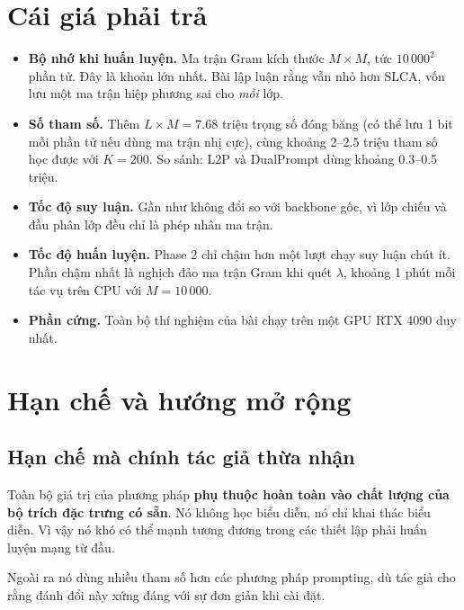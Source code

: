 \documentclass[11pt,a4paper]{article}
\begin{document}
\section{Cái giá phải trả}

\begin{itemize}[leftmargin=*]
\item \textbf{Bộ nhớ khi huấn luyện.} Ma trận Gram kích thước $M \times M$, tức
      $10\,000^2$ phần tử. Đây là khoản lớn nhất. Bài lập luận rằng vẫn nhỏ hơn
      SLCA, vốn lưu một ma trận hiệp phương sai cho \emph{mỗi} lớp.
\item \textbf{Số tham số.} Thêm $L \times M = 7.68$ triệu trọng số đóng băng (có
      thể lưu 1 bit mỗi phần tử nếu dùng ma trận nhị cực), cùng khoảng 2--2.5
      triệu tham số học được với $K = 200$. So sánh: L2P và DualPrompt dùng
      khoảng 0.3--0.5 triệu.
\item \textbf{Tốc độ suy luận.} Gần như không đổi so với backbone gốc, vì lớp
      chiếu và đầu phân lớp đều chỉ là phép nhân ma trận.
\item \textbf{Tốc độ huấn luyện.} Phase 2 chỉ chậm hơn một lượt chạy suy luận
      chút ít. Phần chậm nhất là nghịch đảo ma trận Gram khi quét $\lambda$,
      khoảng 1 phút mỗi tác vụ trên CPU với $M = 10\,000$.
\item \textbf{Phần cứng.} Toàn bộ thí nghiệm của bài chạy trên một GPU
      RTX 4090 duy nhất.
\end{itemize}

\section{Hạn chế và hướng mở rộng}

\subsection{Hạn chế mà chính tác giả thừa nhận}

Toàn bộ giá trị của phương pháp \textbf{phụ thuộc hoàn toàn vào chất lượng của bộ
trích đặc trưng có sẵn}. Nó không học biểu diễn, nó chỉ khai thác biểu diễn. Vì
vậy nó khó có thể mạnh tương đương trong các thiết lập phải huấn luyện mạng từ
đầu.

Ngoài ra nó dùng nhiều tham số hơn các phương pháp prompting, dù tác giả cho rằng
đánh đổi này xứng đáng với sự đơn giản khi cài đặt.
\end{document}
